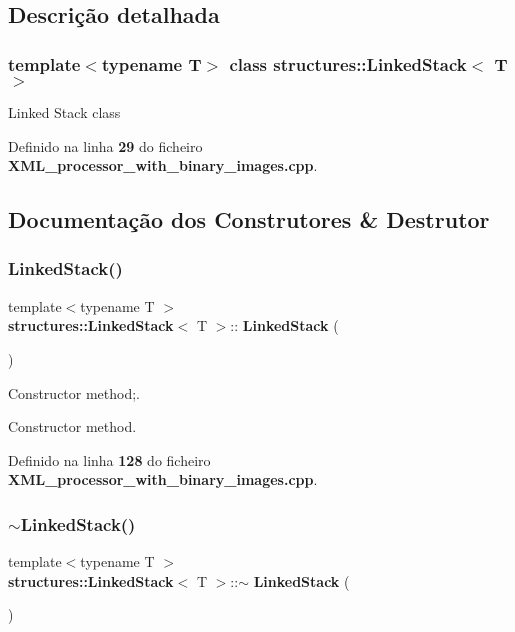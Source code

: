 \subsection{Descrição detalhada}
\subsubsection*{template$<$typename T$>$\newline
class structures\+::\+Linked\+Stack$<$ T $>$}

Linked Stack class 

Definido na linha \textbf{ 29} do ficheiro \textbf{ X\+M\+L\+\_\+processor\+\_\+with\+\_\+binary\+\_\+images.\+cpp}.



\subsection{Documentação dos Construtores \& Destrutor}
\mbox{\label{classstructures_1_1_linked_stack_a546b827cccaa49b4f470110bc3a9004e}} 
\subsubsection{Linked\+Stack()}
{\footnotesize\ttfamily template$<$typename T $>$ \\
\textbf{ structures\+::\+Linked\+Stack}$<$ T $>$\+::\textbf{ Linked\+Stack} (\begin{DoxyParamCaption}{ }\end{DoxyParamCaption})}



Constructor method;. 

Constructor method. 

Definido na linha \textbf{ 128} do ficheiro \textbf{ X\+M\+L\+\_\+processor\+\_\+with\+\_\+binary\+\_\+images.\+cpp}.

\mbox{\label{classstructures_1_1_linked_stack_aae17566eb103c92eb22be2e779286f2f}} 
\subsubsection{$\sim$\+Linked\+Stack()}
{\footnotesize\ttfamily template$<$typename T $>$ \\
\textbf{ structures\+::\+Linked\+Stack}$<$ T $>$\+::$\sim$\textbf{ Linked\+Stack} (\begin{DoxyParamCaption}{ }\end{DoxyParamCaption})}



